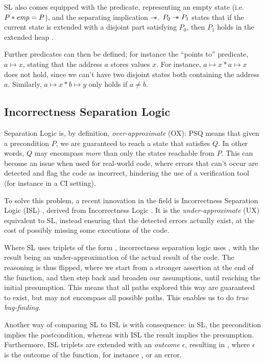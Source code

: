 SL also comes equipped with the \emp{} predicate, representing an empty state (i.e. ${P * \textit{emp} = P}$), and the separating implication $\mathrel{-\!\!\ast}$. $P_0 \mathrel{-\!\!\ast} P_1$ states that if the current state is extended with a disjoint part satisfying $P_0$, then $P_1$ holds in the extended heap \cite{seplogic2}.

Further predicates can then be defined; for instance the ``points to'' predicate, $a \mapsto x$, stating that the address $a$ stores values $x$. For instance, $a \mapsto x * a \mapsto x$ does not hold, since we can't have two disjoint states both containing the address $a$. Similarly, $a\mapsto x * b \mapsto y$ only holds if $a\neq b$.

\subsection{Incorrectness Separation Logic}

Separation Logic is, by definition, \emph{over-approximate} (OX): \SLtriple PSQ means that given a precondition $P$, we are guaranteed to reach a state that satisfies $Q$. In other words, $Q$ may encompass \emph{more} than only the states reachable from $P$. This can become an issue when used for real-world code, where errors that can't occur are detected and flag the code as incorrect, hindering the use of a verification tool (for instance in a CI setting).

To solve this problem, a recent innovation in the field is Incorrectness Separation Logic (ISL) \cite{isl}, derived from Incorrectness Logic \cite{incorrectnesslogic}. It is the \emph{under-approximate} (UX) equivalent to SL, instead ensuring that the detected errors actually exist, at the cost of possibly missing some executions of the code.

Where SL uses triplets of the form , incorrectness separation logic uses , with the result being an under-approximation of the actual result of the code. The reasoning is thus flipped, where we start from a stronger assertion at the end of the function, and then step back and broaden our assumptions, until reaching the initial presumption. This means that all paths explored this way are guaranteed to exist, but may not encompass all possible paths. This enables us to do \emph{true bug-finding}. 

Another way of comparing SL to ISL is with consequence: in SL, the precondition implies the postcondition, whereas with ISL the result implies the presumption. Furthermore, ISL triplets are extended with an \emph{outcome} $\epsilon$, resulting in , where $\epsilon$ is the outcome of the function, for instance \Ok, or an error.

